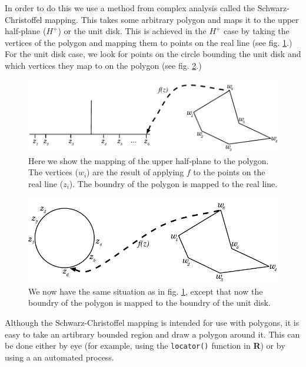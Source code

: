 \documentclass[a4paper,10pt]{amsart}
\newcommand{\sch}{Schwarz-Christoffel }
\begin{document}
In order to do this we use a method from complex analysis called the \sch mapping. This takes some arbitrary polygon and maps it to the upper half-plane ($H^+$) or the unit disk. This is achieved in the $H^+$ case by taking the vertices of the polygon and mapping them to points on the real line (see fig. \ref{reallinedia}.) For the unit disk case, we look for points on the circle bounding the unit disk and which vertices they map to on the polygon (see fig. \ref{unitdiskdia}.)

\begin{figure} [tbp]
\centering
\includegraphics[scale=0.6]{figs/reallinedia.pdf}
\caption{Here we show the mapping of the upper half-plane to the polygon. The vertices ($w_i$) are the result of applying $f$ to the points on the real line ($z_i$). The boundry of the polygon is mapped to the real line.}
\label{reallinedia}
\end{figure}

\begin{figure} [tbp]
\centering
\includegraphics[scale=0.6]{figs/unitdiskdia.pdf}
\caption{We now have the same situation as in fig. \ref{reallinedia}, except that now the boundry of the polygon is mapped to the boundry of the unit disk.}
\label{unitdiskdia}
\end{figure}




Although the \sch mapping is intended for use with polygons, it is easy to take an artibrary bounded region and draw a polygon around it. This can be done either by eye (for example, using the \texttt{locator()} function in \textbf{R}) or by using a an automated process.
\end{document}
